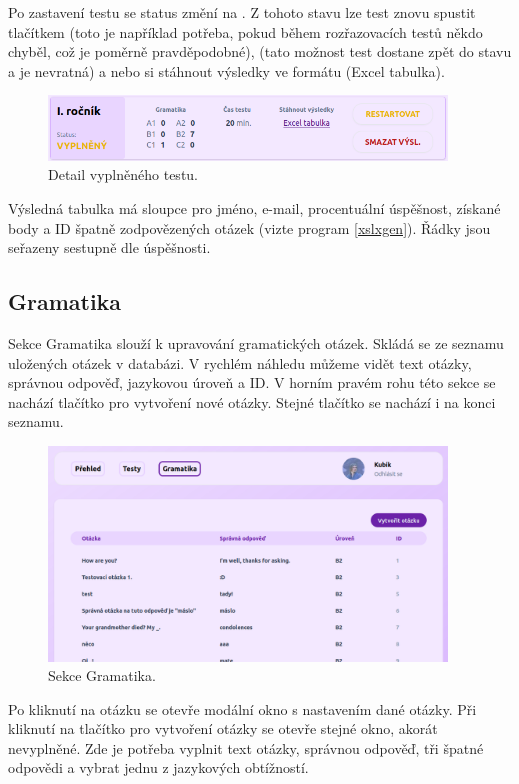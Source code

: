 Po zastavení testu se status změní na . Z tohoto stavu lze test znovu spustit tlačítkem  (toto je například potřeba, pokud během rozřazovacích testů někdo chyběl, což je poměrně pravděpodobné),  (tato možnost test dostane zpět do stavu  a je nevratná) a nebo si stáhnout výsledky ve formátu  (Excel tabulka).

\begin{figure}[H]
    \centering
    \includegraphics[width=400px]{images/01design/test-filled.png}
    \caption{Detail vyplněného testu.}
\end{figure}

Výsledná tabulka má sloupce pro jméno, e-mail, procentuální úspěšnost, získané body a ID špatně zodpovězených otázek (vizte program \ref{xslxgen}). Řádky jsou seřazeny sestupně dle úspěšnosti.

\subsection{Gramatika}

Sekce Gramatika slouží k upravování gramatických otázek. Skládá se ze seznamu uložených otázek v databázi. V rychlém náhledu můžeme vidět text otázky, správnou odpověď, jazykovou úroveň a ID. V horním pravém rohu této sekce se nachází tlačítko pro vytvoření nové otázky. Stejné tlačítko se nachází i na konci seznamu.

\begin{figure}[H]
    \centering
    \includegraphics[width=400px]{images/01design/grammar.png}
    \caption{Sekce Gramatika.}
\end{figure}

Po kliknutí na otázku se otevře modální okno s nastavením dané otázky. Při kliknutí na tlačítko pro vytvoření otázky se otevře stejné okno, akorát nevyplněné. Zde je potřeba vyplnit text otázky, správnou odpověď, tři špatné odpovědi a vybrat jednu z jazykových obtížností. 

